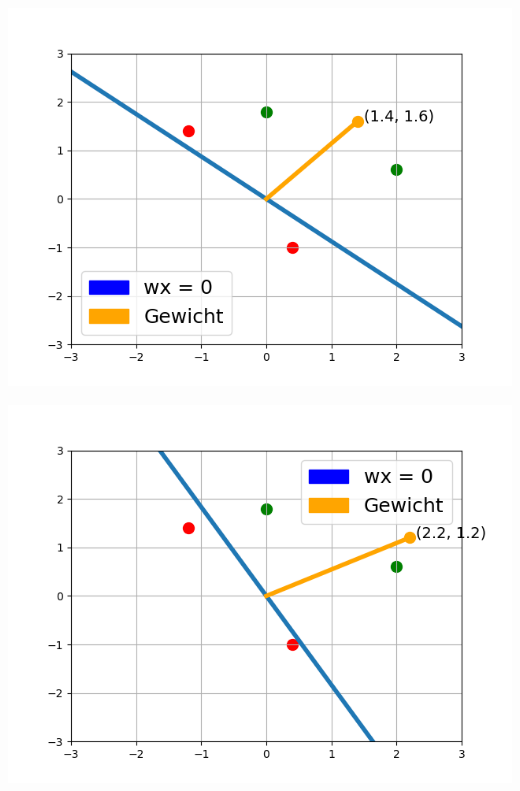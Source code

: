 \documentclass[fontsize=11pt]{scrartcl}
\newenvironment{Figure}
  {\par\medskip\noindent\minipage{\linewidth}}
  {\endminipage\par\medskip}
\begin{document}
                        \begin{Figure}
                            \begin{minipage}[b]{.4\linewidth}
                                \includegraphics[scale=0.5]{bsp3.png}
                                \label{fig:bspPL3}
                            \end{minipage}
                            \hspace{.1\linewidth}
                            \begin{minipage}[b]{.4\linewidth}
                                \includegraphics[scale=0.5]{bsp4.png}
                                \label{fig:bspPL4}    
                            \end{minipage}     
                        \end{Figure}
\end{document}
